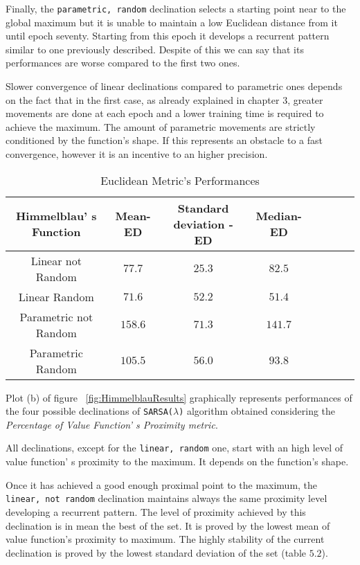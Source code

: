 Finally, the {\tt parametric, random} declination selects a starting point near to the global maximum but it is unable to maintain a low Euclidean distance from it until epoch seventy. Starting from this epoch it develops a recurrent pattern similar to one previously described. Despite of this we can say that its performances are worse compared to the first two ones.

Slower convergence of linear declinations compared to parametric ones depends on the fact that in the first case, as already explained in chapter $3$, greater movements are done at each epoch and a lower training time is required to achieve the maximum. The amount of parametric movements are strictly conditioned by the function's shape.  If this represents an obstacle to a fast convergence, however it is an incentive to an higher precision. \\

\begin{table} [h!]
	\centering
	\resizebox{\linewidth}{!} {
	\begin{tabular}{c| ccccccc}
		\hline \textbf{Himmelblau' s Function}
		& \textbf{Mean-ED} & \textbf{Standard deviation - ED}  &\textbf{Median-ED} \\ 
		\hline Linear not Random
		& $77.7$ &\cellcolor{red!25}$25.3$ & $82.5$  \\ 
		\hline Linear Random
		& \cellcolor{red!25}$71.6$ & $52.2$ & \cellcolor{red!25} $51.4$ \\ 
		\hline Parametric not Random
		& $158.6$ & $71.3$ & $141.7$ \\ 
		\hline Parametric Random
		& $105.5$ & $56.0$ & $93.8$ \\ 
		\hline 
	\end{tabular}
}
\label{HimmelblauTabEuclidean}
\caption{Euclidean Metric's Performances}
\end{table}

Plot (b) of figure ~\ref{fig:HimmelblauResults} graphically represents performances of the four possible declinations of {\tt SARSA($\lambda$)} algorithm obtained considering the \textit{Percentage of Value Function' s Proximity metric}.

All declinations, except for the {\tt linear, random} one, start with an high level of value function' s proximity to the maximum. It depends on the function's shape. 

Once it has achieved a good enough proximal point to the maximum, the {\tt linear, not random} declination maintains always the same proximity level developing a recurrent pattern. The level of proximity achieved by this declination is in mean the best of the set. It is proved by the lowest mean of value function's proximity to maximum. The highly stability of the current declination is proved by the lowest standard deviation of the set (table $5.2$). 

